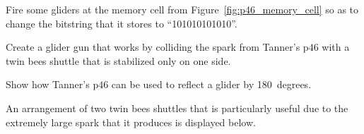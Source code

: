 \begin{multicols}{2}
	
	\mfilbreak
	
	
	\begin{problem}\label{exer:ticker_tape_gun_memory_alter} 
		Fire some gliders at the memory cell from Figure~\ref{fig:p46_memory_cell} so as to change the bitstring that it stores to ``101010101010''.
	\end{problem}
	
	
	\mfilbreak
	
	
	\begin{problem}\label{exer:tanners_p46_twin_bee_gun} 
		Create a glider gun that works by colliding the spark from Tanner's p$46$ with a twin bees shuttle that is stabilized only on one side.
		
	\end{problem}
	
	
	\mfilbreak
	
	
	\begin{problem}\label{exer:tanners_p46_reflect} 
		Show how Tanner's p$46$ can be used to reflect a glider by 180~degrees.
		
	\end{problem}
	
	
	\mfilbreak
	
	
	\begin{problem}\label{exer:twin_bees_large_spark}
		An arrangement of two twin bees shuttles that is particularly useful due to the extremely large spark that it produces is displayed below.
		
		\begin{center}
		\end{center}
		

\end{problem}
\end{multicols}
